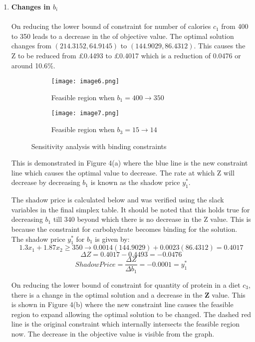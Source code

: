 \documentclass[
]{article}
\begin{document}
\begin{enumerate}
	\item \textbf{Changes in \(b_i\)}\\
	      \\
	      On reducing the lower bound of constraint for number of calories \(c_1\) from 400 to 350 leads to a decrease in the of objective value.
	      The optimal solution changes from $\left(214.3152, 64.9145\right)$ to $\left(144.9029, 86.4312\right)$. This causes the Z to be reduced from \pounds 0.4493 to \pounds 0.4017 which is a reduction of 0.0476 or around 10.6\%.
	      	          
	      \begin{figure}[ht]
	      	\begin{subfigure}{.5\textwidth}
	      		\centering
	      		\texttt{[image: image6.png]}  
	      		\caption{Feasible region when \(b_1 = 400 → 350\)}
	      		\label{fig:sub-first}
	      	\end{subfigure}
	      	\begin{subfigure}{.5\textwidth}
	      		\centering
	      		\texttt{[image: image7.png]}  
	      		\caption{Feasible region when \(b_3 = 15 → 14\)}
	      		\label{fig:sub-second}
	      	\end{subfigure}
	      	\caption{Sensitivity analysis with binding constraints}
	      	\label{fig:fig}
	      \end{figure}
	      	          
	      This is demonstrated in Figure 4(a) where the blue line is the new constraint line which causes the optimal value to decrease. The rate at which Z will decrease by decreasing $b_1$ is known as the shadow price $y_1^\ast$. 
	      	          
	      The shadow price is calculated below and was verified using the slack variables in the final simplex table. It should be noted that this holds true for decreasing $b_1$ till 340 beyond which there is no decrease in the Z value.
	      This is because the constraint for carbohydrate becomes binding for the solution. The shadow price $y_1^\ast$ for $b_1$ is given by:
	      \[ 1.3x_1 + 1.87x_2 \ge 350 \rightarrow  0.0014\left( 144.9029\right) + 0.0023\left(86.4312\right) = 0.4017\]
	      \[ \Delta Z = 0.4017 -0.4493 = -0.0476 \]
	      \[ Shadow Price = \frac{\Delta Z}{\Delta b_1} = -0.0001 = y_1^\ast\]
	      	      
	      On reducing the lower bound of constraint for quantity of protein in a diet \(c_3\), there is a change in the optimal solution and a decrease in the \textbf{Z} value.
	      This is shown in Figure 4(b) where the new constraint line causes the feasible region to expand allowing the optimal solution to be changed. The dashed red line is the original constraint which internally intersects the feasible region now.
	      The decrease in the objective value is visible from the graph. 
	      	          

\end{enumerate}
\end{document}
